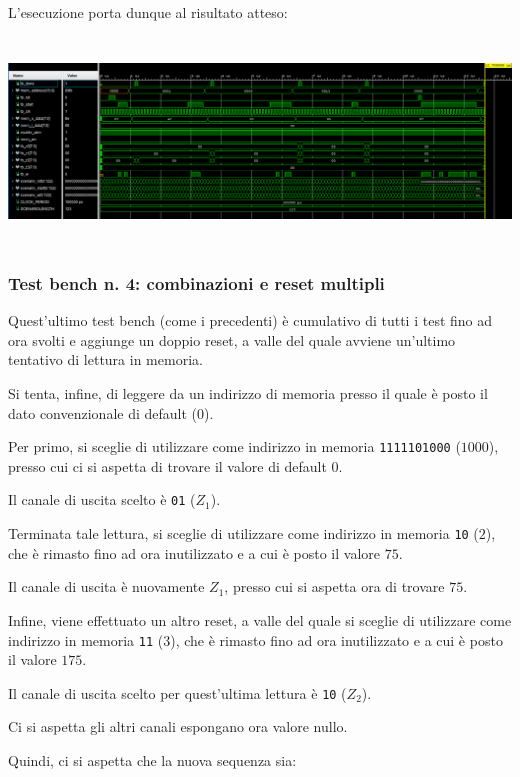 \documentclass[a4paper,11pt]{article} %
\begin{document}
    L'esecuzione porta dunque al risultato atteso:
    \smallskip

    \includegraphics[height=5.5cm]{../res/tb-3}

    \newpage

    \subsubsection{Test bench n. 4: combinazioni e reset multipli}
    Quest'ultimo test bench (come i precedenti) è cumulativo di tutti i test fino ad ora svolti e aggiunge un doppio reset, a valle del quale avviene
    un'ultimo tentativo di lettura in memoria.

    Si tenta, infine, di leggere da un indirizzo di memoria presso il quale è posto il dato convenzionale di default ($0$).

    Per primo, si sceglie di utilizzare come indirizzo in memoria \texttt{1111101000} ($1000$), presso cui ci si aspetta di trovare il valore di default $0$.

    Il canale di uscita scelto è \texttt{01} ($Z_1$).

    Terminata tale lettura, si sceglie di utilizzare come indirizzo in memoria \texttt{10} ($2$), che è rimasto fino ad ora inutilizzato e a cui è posto il valore $75$.

    Il canale di uscita è nuovamente $Z_1$, presso cui si aspetta ora di trovare $75$.

    Infine, viene effettuato un altro reset, a valle del quale si sceglie di utilizzare come indirizzo in memoria \texttt{11} ($3$), che è rimasto fino ad ora inutilizzato e a cui è posto il valore $175$.

    Il canale di uscita scelto per quest'ultima lettura è \texttt{10} ($Z_2$).

    Ci si aspetta gli altri canali espongano ora valore nullo.

    Quindi, ci si aspetta che la nuova sequenza sia:
    \medskip
\end{document}
